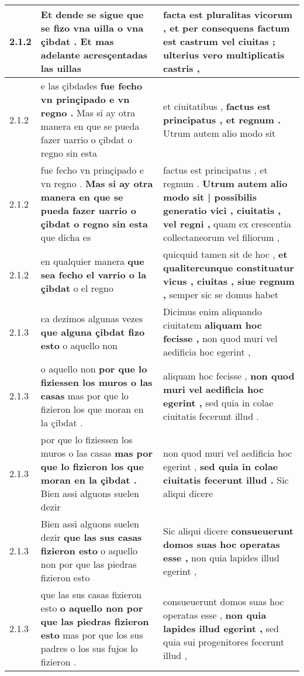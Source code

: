 \begin{tabular}{|p{1cm}|p{6.5cm}|p{6.5cm}|}
2.1.2 & Et dende se sigue \textbf{ que se fizo vna uilla o vna çibdat . } Et mas adelante acresçentadas las uillas & facta est pluralitas vicorum , \textbf{ et per consequens factum est castrum vel ciuitas ; } ulterius vero multiplicatis castris , \\\hline
2.1.2 & e las çibdades \textbf{ fue fecho vn prinçipado e vn regno . } Mas si ay otra manera en que se pueda fazer uarrio o çibdat o regno sin esta & et ciuitatibus , \textbf{ factus est principatus , et regnum . } Utrum autem alio modo sit \\\hline
2.1.2 & fue fecho vn prinçipado e vn regno . \textbf{ Mas si ay otra manera en que se pueda fazer uarrio o çibdat o regno sin esta } que dicha es & factus est principatus , et regnum . \textbf{ Utrum autem alio modo sit | possibilis generatio vici , ciuitatis , vel regni , } quam ex crescentia collectaneorum vel filiorum , \\\hline
2.1.2 & en qualquier manera \textbf{ que sea fecho el varrio o la çibdat } o el regno & quicquid tamen sit de hoc , \textbf{ et qualitercunque constituatur vicus , ciuitas , siue regnum , } semper sic se domus habet \\\hline
2.1.3 & ca dezimos algunas vezes \textbf{ que alguna çibdat fizo esto } o aquello non & Dicimus enim aliquando ciuitatem \textbf{ aliquam hoc fecisse , } non quod muri vel aedificia hoc egerint , \\\hline
2.1.3 & o aquello non \textbf{ por que lo fiziessen los muros o las casas } mas por que lo fizieron los que moran en la çibdat . & aliquam hoc fecisse , \textbf{ non quod muri vel aedificia hoc egerint , } sed quia in colae ciuitatis fecerunt illud . \\\hline
2.1.3 & por que lo fiziessen los muros o las casas \textbf{ mas por que lo fizieron los que moran en la çibdat . } Bien assi alguons suelen dezir & non quod muri vel aedificia hoc egerint , \textbf{ sed quia in colae ciuitatis fecerunt illud . } Sic aliqui dicere \\\hline
2.1.3 & Bien assi alguons suelen dezir \textbf{ que las sus casas fizieron esto } o aquello non por que las piedras fizieron esto & Sic aliqui dicere \textbf{ consueuerunt domos suas hoc operatas esse , } non quia lapides illud egerint , \\\hline
2.1.3 & que las sus casas fizieron esto \textbf{ o aquello non por que las piedras fizieron esto } mas por que los sus padres o los sus fujos lo fizieron . & consueuerunt domos suas hoc operatas esse , \textbf{ non quia lapides illud egerint , } sed quia sui progenitores fecerunt illud , \\\hline

\end{tabular}
